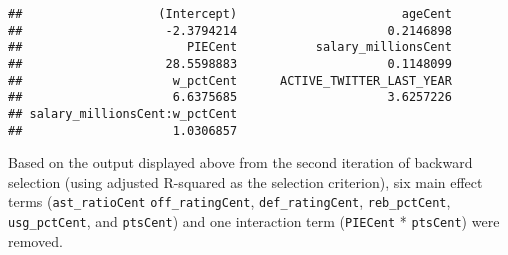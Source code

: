 \documentclass[]{article}
\newenvironment{Shaded}{\begin{snugshade}}{\end{snugshade}}
\newcommand{\DataTypeTok}[1]{\textcolor[rgb]{0.13,0.29,0.53}{#1}}
\newcommand{\KeywordTok}[1]{\textcolor[rgb]{0.13,0.29,0.53}{\textbf{#1}}}
\newcommand{\NormalTok}[1]{#1}
\newcommand{\OperatorTok}[1]{\textcolor[rgb]{0.81,0.36,0.00}{\textbf{#1}}}
\newcommand{\StringTok}[1]{\textcolor[rgb]{0.31,0.60,0.02}{#1}}
\begin{document}
\begin{Shaded}
\end{Shaded}

\begin{verbatim}
##                   (Intercept)                       ageCent 
##                    -2.3794214                     0.2146898 
##                       PIECent           salary_millionsCent 
##                    28.5598883                     0.1148099 
##                     w_pctCent      ACTIVE_TWITTER_LAST_YEAR 
##                     6.6375685                     3.6257226 
## salary_millionsCent:w_pctCent 
##                     1.0306857
\end{verbatim}

Based on the output displayed above from the second iteration of
backward selection (using adjusted R-squared as the selection
criterion), six main effect terms (\texttt{ast\_ratioCent}
\texttt{off\_ratingCent}, \texttt{def\_ratingCent},
\texttt{reb\_pctCent}, \texttt{usg\_pctCent}, and \texttt{ptsCent}) and
one interaction term (\texttt{PIECent} * \texttt{ptsCent}) were removed.
\end{document}
